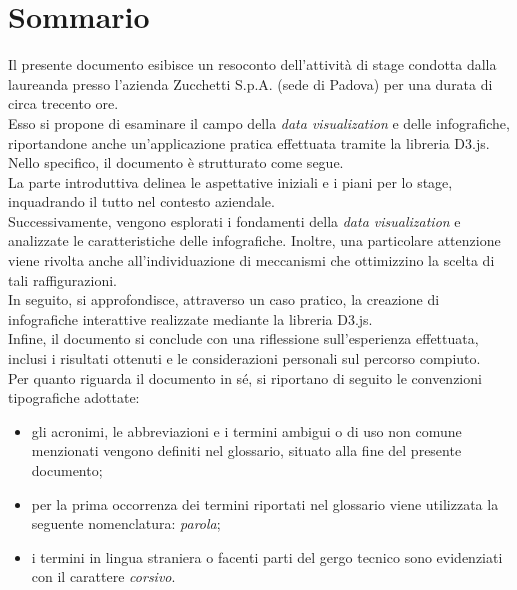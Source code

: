 \cleardoublepage
{}
{}
\begingroup
\let\clearpage\relax
\let\cleardoublepage\relax
\let\cleardoublepage\relax

\chapter*{Sommario}

Il presente documento esibisce un resoconto dell'attività di stage condotta dalla laureanda \myName \space presso 
l'azienda Zucchetti S.p.A. (sede di Padova) per una durata di circa trecento ore.\\

\noindent Esso si propone di esaminare il campo della \emph{data visualization} e delle infografiche, riportandone 
anche un'applicazione pratica effettuata tramite la libreria D3.js. 
\\

\noindent Nello specifico, il documento è strutturato come segue. \\
La parte introduttiva delinea le aspettative iniziali e i piani per lo stage, 
inquadrando il tutto nel contesto aziendale. \\
Successivamente, vengono esplorati i fondamenti della \emph{data visualization} e analizzate le caratteristiche 
delle infografiche. Inoltre, una particolare attenzione viene rivolta anche all'individuazione di meccanismi 
che ottimizzino la scelta di tali raffigurazioni.\\
In seguito, si approfondisce, attraverso un caso pratico, la creazione di infografiche interattive 
realizzate mediante la libreria D3.js.\\
Infine, il documento si conclude con una riflessione sull'esperienza effettuata, inclusi i risultati ottenuti 
e le considerazioni personali sul percorso compiuto.\\

\noindent Per quanto riguarda il documento in sé, si riportano di seguito le convenzioni tipografiche adottate:
\begin{itemize}
    \item gli acronimi, le abbreviazioni e i termini ambigui o di uso non comune menzionati vengono definiti nel glossario, situato alla fine del presente documento;
    \item per la prima occorrenza dei termini riportati nel glossario viene utilizzata la seguente nomenclatura: \emph{parola}\glsfirstoccur;
    \item i termini in lingua straniera o facenti parti del gergo tecnico sono evidenziati con il carattere \emph{corsivo}.
\end{itemize}





\endgroup

\vfill
